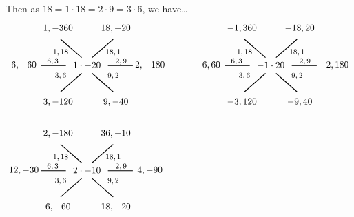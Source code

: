 \documentclass[11pt,letterpaper]{article}
\begin{document}
Then as $18= 1 \cdot 18= 2 \cdot 9= 3 \cdot 6$, we have\dots
	\[
	\begin{tikzpicture}
	\node at (0,0) {$1 \cdot -20$};
	\node at (-1.0,0.5) {\footnotesize$1, 18$};
	\draw[line width=0.03cm,label={1}] (-0.2,0.3) -- (-1,1);
	\node at (-1.1,1.4) {$1, -360$};
	\node at (1.0,0.5) {\footnotesize$18, 1$};
	\draw[line width=0.03cm] (0.2,0.3) -- (1,1);	
	\node at (1.1,1.4) {$18, -20$};	
	\node at (1.3,0.15) {\footnotesize$2, 9$};
	\draw[line width=0.03cm] (0.8,0) -- (1.75,0);
	\node at (2.4,0) {$2, -180$};
	\node at (1.0,-0.4) {\footnotesize$9, 2$};
	\draw[line width=0.03cm] (0.2,-0.3) -- (1,-1);
	\node at (1.1,-1.4) {$9, -40$};
	\node at (-1.0,-0.4) {\footnotesize$3, 6$};
	\draw[line width=0.03cm,label={1}] (-0.2,-0.3) -- (-1,-1);
	\node at (-1.1,-1.4) {$3, -120$};
	\node at (-1.3,0.15) {\footnotesize$6, 3$};
	\draw[line width=0.03cm] (-0.8,0) -- (-1.75,0);
	\node at (-2.4,0) {$6, -60$};
	
	\tikzset{shift={(7,0)}}

	\node at (0,0) {$-1 \cdot 20$};
	\node at (-1.0,0.5) {\footnotesize$1, 18$};
	\draw[line width=0.03cm,label={1}] (-0.2,0.3) -- (-1,1);
	\node at (-1.1,1.4) {$-1, 360$};
	\node at (1.0,0.5) {\footnotesize$18, 1$};
	\draw[line width=0.03cm] (0.2,0.3) -- (1,1);	
	\node at (1.1,1.4) {$-18, 20$};	
	\node at (1.3,0.15) {\footnotesize$2, 9$};
	\draw[line width=0.03cm] (0.8,0) -- (1.75,0);
	\node at (2.4,0) {$-2, 180$};
	\node at (1.0,-0.4) {\footnotesize$9, 2$};
	\draw[line width=0.03cm] (0.2,-0.3) -- (1,-1);
	\node at (1.1,-1.4) {$-9, 40$};
	\node at (-1.0,-0.4) {\footnotesize$3, 6$};
	\draw[line width=0.03cm,label={1}] (-0.2,-0.3) -- (-1,-1);
	\node at (-1.1,-1.4) {$-3, 120$};
	\node at (-1.3,0.15) {\footnotesize$6, 3$};
	\draw[line width=0.03cm] (-0.8,0) -- (-1.75,0);
	\node at (-2.4,0) {$-6, 60$};

	\tikzset{shift={(-7,-4)}}

	\node at (0,0) {$2 \cdot -10$};
	\node at (-1.0,0.5) {\footnotesize$1, 18$};
	\draw[line width=0.03cm,label={1}] (-0.2,0.3) -- (-1,1);
	\node at (-1.1,1.4) {$2, -180$};
	\node at (1.0,0.5) {\footnotesize$18, 1$};
	\draw[line width=0.03cm] (0.2,0.3) -- (1,1);	
	\node at (1.1,1.4) {$36, -10$};	
	\node at (1.3,0.15) {\footnotesize$2, 9$};
	\draw[line width=0.03cm] (0.8,0) -- (1.75,0);
	\node at (2.4,0) {$4, -90$};
	\node at (1.0,-0.4) {\footnotesize$9, 2$};
	\draw[line width=0.03cm] (0.2,-0.3) -- (1,-1);
	\node at (1.1,-1.4) {$18, -20$};
	\node at (-1.0,-0.4) {\footnotesize$3, 6$};
	\draw[line width=0.03cm,label={1}] (-0.2,-0.3) -- (-1,-1);
	\node at (-1.1,-1.4) {$6, -60$};
	\node at (-1.3,0.15) {\footnotesize$6, 3$};
	\draw[line width=0.03cm] (-0.8,0) -- (-1.75,0);
	\node at (-2.4,0) {$12, -30$};


\end{tikzpicture}\]
\end{document}
